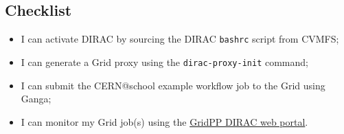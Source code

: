 \subsection{Checklist}
\label{moving-the-example-workflow-to-the-grid---checklist}

\begin{itemize}
\tightlist
\item
  I can activate DIRAC by sourcing the DIRAC \texttt{bashrc} script from
  CVMFS;
\item
  I can generate a Grid proxy using the \texttt{dirac-proxy-init}
  command;
\item
  I can submit the CERN@school example workflow job to the Grid using
  Ganga;
\item
  I can monitor my Grid job(s) using the
  \href{https://dirac.gridpp.ac.uk}{GridPP DIRAC web portal}.
\end{itemize}
